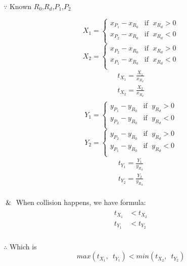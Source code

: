 $\because$ Known $R_0$,\enspace$R_d$,\enspace$P_1$,\enspace$P_2$
\begin{multicols}{2}
\noindent
\[
X_1 =
\begin{cases}
x_{P_1} - x_{R_0} & \text{if }\;x_{R_d} > 0\\
x_{P_2} - x_{R_0} & \text{if }\;x_{R_d} < 0\\
\end{cases}
\]
\[
X_2 =
\begin{cases}
x_{P_2} - x_{R_0} & \text{if }\;x_{R_d} > 0\\
x_{P_1} - x_{R_0} & \text{if }\;x_{R_d} < 0\\
\end{cases}
\]
\[
\begin{array}{lr}
t_{X_1} = \frac{X_1}{x_{R_d}}\\
t_{X_2} = \frac{X_2}{x_{R_d}}\\
\end{array}
\]
\columnbreak
\[
Y_1 =
\begin{cases}
y_{P_1} - y_{R_0} & \text{if }\;y_{R_d} > 0\\
y_{P_2} - y_{R_0} & \text{if }\;y_{R_d} < 0\\
\end{cases}
\]
\[
Y_2 =
\begin{cases}
y_{P_2} - y_{R_0} & \text{if }\;y_{R_d} > 0\\
y_{P_1} - y_{R_0} & \text{if }\;y_{R_d} < 0\\
\end{cases}
\]
\[
\begin{array}{lr}
t_{Y_1} = \frac{Y_1}{y_{R_d}}\\
t_{Y_2} = \frac{Y_2}{y_{R_d}}\\
\end{array}
\]
\end{multicols}

$\And$ When collision happens,  we have formula:
\[
\begin{array}{lr}
\begin{aligned}
t_{X_1} &< t_{X_2}\\
t_{Y_1} &< t_{Y_2}\\
\end{aligned}
\end{array}
\]

$\therefore$ Which is
\begin{equation}
\label{equ:ray-box-2d-intersection}
max(t_{X_1},\enspace t_{Y_1}) < min(t_{X_2},\enspace t_{Y_2})
\end{equation}

